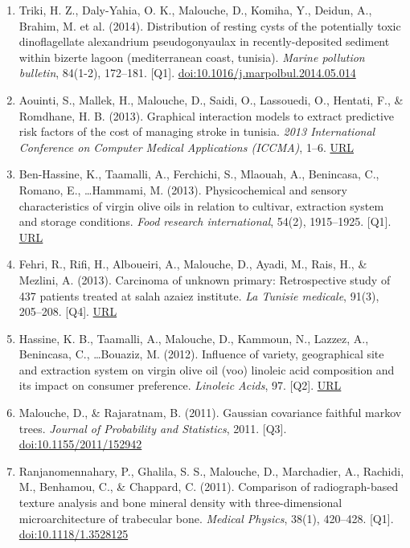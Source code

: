 \documentclass[11pt,a4paper,sans]{moderncv}
\begin{document}
\begin{enumerate}
\item Triki, H. Z., Daly-Yahia, O. K., Malouche, D., Komiha, Y., Deidun, A., Brahim, M. et al. (2014). Distribution of resting cysts of the potentially toxic dinoflagellate alexandrium pseudogonyaulax in recently-deposited sediment within bizerte lagoon (mediterranean coast, tunisia). \textit{Marine pollution bulletin}, 84(1-2), 172–181. [Q1]. \href{https://doi.org/10.1016/j.marpolbul.2014.05.014}{doi:10.1016/j.marpolbul.2014.05.014}
\item Aouinti, S., Mallek, H., Malouche, D., Saidi, O., Lassouedi, O., Hentati, F., \& Romdhane, H. B. (2013). Graphical interaction models to extract predictive risk factors of the cost of managing stroke in tunisia. \textit{2013 International Conference on Computer Medical Applications (ICCMA)}, 1–6. \href{https://ieeexplore.ieee.org/document/6506162}{URL}
\item Ben-Hassine, K., Taamalli, A., Ferchichi, S., Mlaouah, A., Benincasa, C., Romano, E., \ldots Hammami, M. (2013). Physicochemical and sensory characteristics of virgin olive oils in relation to cultivar, extraction system and storage conditions. \textit{Food research international}, 54(2), 1915–1925. [Q1]. \href{https://scholar.cnki.net/Detail/doi/GARJ2013/SJES14010600411056}{URL}
\item Fehri, R., Rifi, H., Alboueiri, A., Malouche, D., Ayadi, M., Rais, H., \& Mezlini, A. (2013). Carcinoma of unknown primary: Retrospective study of 437 patients treated at salah azaiez institute. \textit{La Tunisie medicale}, 91(3), 205–208. [Q4]. \href{https://www.latunisiemedicale.com/article-medicale-tunisie_2165_en}{URL}
\item Hassine, K. B., Taamalli, A., Malouche, D., Kammoun, N., Lazzez, A., Benincasa, C., \ldots Bouaziz, M. (2012). Influence of variety, geographical site and extraction system on virgin olive oil (voo) linoleic acid composition and its impact on consumer preference. \textit{Linoleic Acids}, 97. [Q2]. \href{https://www.researchgate.net/publication/288652330_Influence_of_variety_geographical_site_and_extraction_system_on_virgin_olive_oil_VOO_linoleic_acid_composition_and_its_impact_on_consumer_preference}{URL}
\item Malouche, D., \& Rajaratnam, B. (2011). Gaussian covariance faithful markov trees. \textit{Journal of Probability and Statistics}, 2011. [Q3]. \href{https://doi.org/10.1155/2011/152942}{doi:10.1155/2011/152942}
\item Ranjanomennahary, P., Ghalila, S. S., Malouche, D., Marchadier, A., Rachidi, M., Benhamou, C., \& Chappard, C. (2011). Comparison of radiograph-based texture analysis and bone mineral density with three-dimensional microarchitecture of trabecular bone. \textit{Medical Physics}, 38(1), 420–428. [Q1]. \href{https://doi.org/10.1118/1.3528125}{doi:10.1118/1.3528125}

\end{enumerate}
\end{document}
